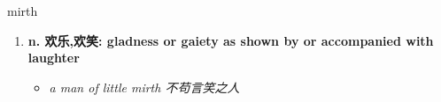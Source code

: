 
\begin{frame}
{\huge mirth}
\begin{center}
\begin{enumerate}\Large
  \item \textbf{n. 欢乐,欢笑: gladness or gaiety as shown by or accompanied with laughter}
  \begin{itemize}
    \item \em{\Large{a man of little mirth 不苟言笑之人}}
  \end{itemize}
\end{enumerate}
\end{center}
\end{frame}
